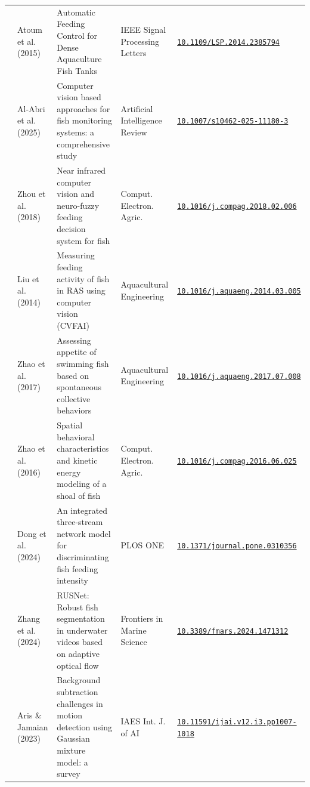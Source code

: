 \documentclass[11pt,a4paper]{article}
\begin{document}
\begin{small}
\begin{longtable}{p{0.5cm} p{2.6cm} p{5.3cm} p{3.5cm} p{3.4cm}}
\addlinespace
08 & Atoum et al. (2015) & Automatic Feeding Control for Dense Aquaculture Fish Tanks & IEEE Signal Processing Letters & \href{https://doi.org/10.1109/LSP.2014.2385794}{\footnotesize\nolinkurl{10.1109/LSP.2014.2385794}} \\
\addlinespace
09 & Al-Abri et al. (2025) & Computer vision based approaches for fish monitoring systems: a comprehensive study & Artificial Intelligence Review & \href{https://doi.org/10.1007/s10462-025-11180-3}{\footnotesize\nolinkurl{10.1007/s10462-025-11180-3}} \\
\addlinespace
10 & Zhou et al. (2018) & Near infrared computer vision and neuro-fuzzy feeding decision system for fish & Comput. Electron. Agric. & \href{https://doi.org/10.1016/j.compag.2018.02.006}{\footnotesize\nolinkurl{10.1016/j.compag.2018.02.006}} \\
\addlinespace
11 & Liu et al. (2014) & Measuring feeding activity of fish in RAS using computer vision (CVFAI) & Aquacultural Engineering & \href{https://doi.org/10.1016/j.aquaeng.2014.03.005}{\footnotesize\nolinkurl{10.1016/j.aquaeng.2014.03.005}} \\
\addlinespace
12 & Zhao et al. (2017) & Assessing appetite of swimming fish based on spontaneous collective behaviors & Aquacultural Engineering & \href{https://doi.org/10.1016/j.aquaeng.2017.07.008}{\footnotesize\nolinkurl{10.1016/j.aquaeng.2017.07.008}} \\
\addlinespace
13 & Zhao et al. (2016) & Spatial behavioral characteristics and kinetic energy modeling of a shoal of fish & Comput. Electron. Agric. & \href{https://doi.org/10.1016/j.compag.2016.06.025}{\footnotesize\nolinkurl{10.1016/j.compag.2016.06.025}} \\
\addlinespace
14 & Dong et al. (2024) & An integrated three-stream network model for discriminating fish feeding intensity & PLOS ONE & \href{https://doi.org/10.1371/journal.pone.0310356}{\footnotesize\nolinkurl{10.1371/journal.pone.0310356}} \\
\addlinespace
15 & Zhang et al. (2024) & RUSNet: Robust fish segmentation in underwater videos based on adaptive optical flow & Frontiers in Marine Science & \href{https://doi.org/10.3389/fmars.2024.1471312}{\footnotesize\nolinkurl{10.3389/fmars.2024.1471312}} \\
\addlinespace
16 & Aris \& Jamaian (2023) & Background subtraction challenges in motion detection using Gaussian mixture model: a survey & IAES Int. J. of AI & \href{https://doi.org/10.11591/ijai.v12.i3.pp1007-1018}{\footnotesize\nolinkurl{10.11591/ijai.v12.i3.pp1007-1018}} \\

\end{longtable}
\end{small}
\end{document}
